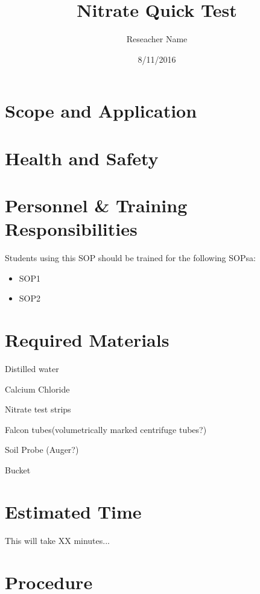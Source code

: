 \documentclass[12pt]{../SOP2}
\title{Nitrate Quick Test}
\date{8/11/2016}
\author{Reseacher Name}
\begin{document}


\maketitle

\section{Scope and Application}

\NP \blindtext

\NP \lipsum[1]

\section{Health and Safety}

\NP \lipsum[2]


\section{Personnel \& Training Responsibilities}

\NP \lipsum[1]

Students using this SOP should be trained for the following SOPsa:

\begin{itemize}
  \item SOP1
  \item SOP2
\end{itemize}


\section{Required Materials}

\NP Distilled water

\NP Calcium Chloride

\NP Nitrate test strips

\NP Falcon tubes(volumetrically marked centrifuge tubes?)

\NP Soil Probe (Auger?)

\NP Bucket

\section{Estimated Time}

\NP This will take XX minutes...

\section{Procedure}
\end{document}
